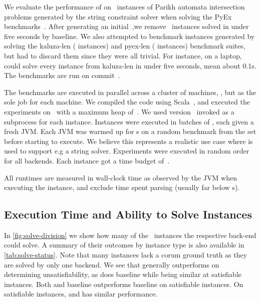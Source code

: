 
We evaluate the performance of \Catra{} on~\NrBenchmarks{} instances of Parikh
automata intersection problems generated by the \OstrichPlus{} string constraint
solver when solving the PyEx benchmarks~\cite{pyex}. After generating an
initial~\InitialNrBenchmarks{},we remove~\NrTrivial{} instances solved in under
five seconds by baseline. We also attempted to benchmark instances generated by
\Ostrich{} solving the kaluza-len ( instances) and pyex-len
( instances) benchmark suites, but had to discard them since they
were all trivial. For instance, on a laptop, \Calculus{} could solve every
instance from kaluza-len in under five seconds, mean about 0.1s. The benchmarks
are run on commit~\texttt{\commit}.

The benchmarks are executed in parallel across a cluster of 
machines, \BenchmarkRig{}, but as the sole job for each machine.  We compiled
the code using Scala~\ScalaVersion{}, and executed the experiments
on~\JvmVersion{} with a maximum heap of~\MaxHeapSize{}. We used \Nuxmv{}
version~\NuxmvVersion{} invoked as a subprocess for each instance. Instances
were executed in batches of \BatchSize{}, each given a fresh JVM. Each JVM was
warmed up for s on a random benchmark from the set before starting
to execute. We believe this represents a realistic use case where \Calculus{} is
used to support e.g a string solver. Experiments were executed in random order
for all backends. Each instance got a time budget of~\RuntimeTimeout.

All runtimes are measured in wall-clock time as observed by the JVM when
executing the instance, and exclude time spent parsing (usually far below
s).

\subsection{Execution Time and Ability to Solve Instances}\label{sec:runtime}

In \cref{fig:solve-division} we show how many of the~\NrBenchmarks{} instances
the respective back-end could solve. A summary of their outcomes by instance
type is also available in \cref{tab:solve-status}. Note that many instances lack
a corum ground truth as they are solved by only one backend. We see that
\Calculus{} generally outperforms \Nuxmv{} on determining unsatisfiability, as
does baseline while being similar at satisfiable instances. Both \Calculus{} and
baseline outperforms baseline on satisfiable instances. On satisfiable
instances, \Nuxmv and \Calculus{} has similar performance.

